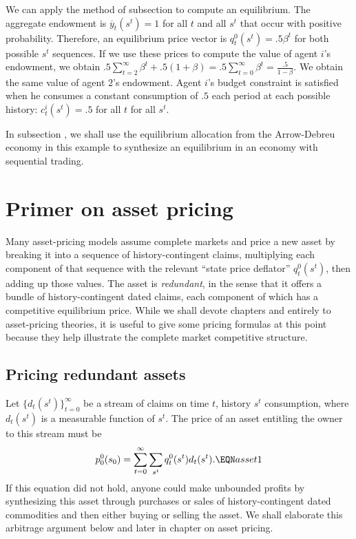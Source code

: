 We can apply the method of subsection  to compute an equilibrium.  The aggregate endowment is $\overline y_t(s^t)=1$
for all $t$ and all $s^t$ that occur with positive probability.  Therefore, an equilibrium price vector is $q_t^0 (s^t) = .5 \beta^t$ for
both possible $s^t$ sequences.
If we use these prices to compute the value of agent $i$'s endowment, we obtain $.5 \sum_{t=2}^\infty \beta^t + .5 (1 + \beta) = .5 \sum_{t=0}^\infty \beta^t 
 = {\frac{.5}{1-\beta}}$.  We obtain the same value of agent $2$'s endowment.
%
  Agent $i$'s budget constraint is satisfied when he consumes a constant
consumption of $.5$ each period at  each possible history: $c_t^i(s^t) = .5$ for all $t$ for all $s^t$.

In subsection , we shall use the equilibrium allocation from the Arrow-Debreu economy in this example
to synthesize an equilibrium in an economy with sequential trading.





\section{Primer on asset pricing}
Many asset-pricing models       assume complete markets and price
a new asset by breaking it into a sequence of history-contingent
claims, multiplying each  component of that sequence with the
relevant ``state price deflator'' $q_t^0(s^t)$, then adding up
those values. The  asset is  {\it redundant\/}, in the
sense that it offers a bundle of history-contingent dated claims,
each component of which has a competitive equilibrium price.
While we shall devote chapters  and  entirely  to
asset-pricing theories, it is useful to give some pricing formulas
at this  point because they help illustrate  the complete market
competitive structure.


\subsection{Pricing redundant assets}
  Let $\{d_t(s^t)\}_{t=0}^\infty$ be a stream of claims
on time $t$, history $s^t$ consumption, where $d_t(s^t)$ is a measurable
function of $s^t$.  The price of   an asset entitling
the owner to this stream
must be
$$ p^0_0(s_0)  = \sum_{t=0}^\infty  \sum_{s^t} q_t^0(s^t) d_t(s^t) . \EQN asset1
$$
If this equation did not hold, anyone could make unbounded profits
by synthesizing this asset  through
purchases or sales  of  history-contingent dated commodities
and then either buying or selling the asset.
We shall elaborate  this arbitrage argument
below and later in  chapter  on asset pricing.




